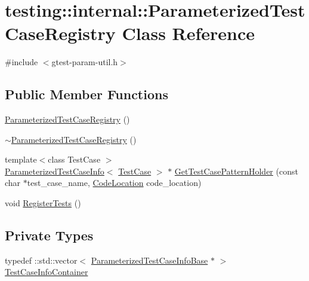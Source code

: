 \hypertarget{classtesting_1_1internal_1_1_parameterized_test_case_registry}{}\section{testing\+::internal\+::Parameterized\+Test\+Case\+Registry Class Reference}
\label{classtesting_1_1internal_1_1_parameterized_test_case_registry}


{\ttfamily \#include $<$gtest-\/param-\/util.\+h$>$}

\subsection*{Public Member Functions}
\begin{DoxyCompactItemize}
\item 
\mbox{\hyperlink{classtesting_1_1internal_1_1_parameterized_test_case_registry_aacafaaf78ca09bbd9f5eed93ae2b6225}{Parameterized\+Test\+Case\+Registry}} ()
\item 
\mbox{\hyperlink{classtesting_1_1internal_1_1_parameterized_test_case_registry_a695c86db8545a3745873190b91a13c9f}{$\sim$\+Parameterized\+Test\+Case\+Registry}} ()
\item 
{\footnotesize template$<$class Test\+Case $>$ }\\\mbox{\hyperlink{classtesting_1_1internal_1_1_parameterized_test_case_info}{Parameterized\+Test\+Case\+Info}}$<$ \mbox{\hyperlink{classtesting_1_1_test_case}{Test\+Case}} $>$ $\ast$ \mbox{\hyperlink{classtesting_1_1internal_1_1_parameterized_test_case_registry_af525816aa348f9e33f5d900965991388}{Get\+Test\+Case\+Pattern\+Holder}} (const char $\ast$test\+\_\+case\+\_\+name, \mbox{\hyperlink{structtesting_1_1internal_1_1_code_location}{Code\+Location}} code\+\_\+location)
\item 
void \mbox{\hyperlink{classtesting_1_1internal_1_1_parameterized_test_case_registry_ad5b63c8fe94f3d51d039a76c001c9223}{Register\+Tests}} ()
\end{DoxyCompactItemize}
\subsection*{Private Types}
\begin{DoxyCompactItemize}
\item 
typedef \+::std\+::vector$<$ \mbox{\hyperlink{classtesting_1_1internal_1_1_parameterized_test_case_info_base}{Parameterized\+Test\+Case\+Info\+Base}} $\ast$ $>$ \mbox{\hyperlink{classtesting_1_1internal_1_1_parameterized_test_case_registry_a4b2cde8f4f92749a8f685f33a9a3f7bf}{Test\+Case\+Info\+Container}}
\end{DoxyCompactItemize}
